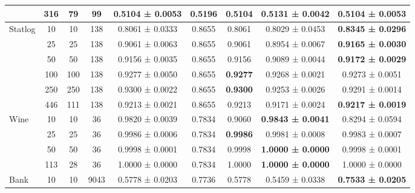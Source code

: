 \begin{table}
{\begin{tabular}[H]{@{}lcccccccc@{}}
                              & 316   & 79   & 99   & 0.5104 ± 0.0053      & 0.5196                & 0.5104          & \textbf{0.5131 ± 0.0042} & 0.5104 ± 0.0053          \\
                              \midrule
\multirow{6}{*}{Statlog}      & 10    & 10   & 138  & 0.8061 ± 0.0333      & 0.8655                & 0.8061          & 0.8029 ± 0.0453          & \textbf{0.8345 ± 0.0296} \\
                              & 25    & 25   & 138  & 0.9061 ± 0.0063      & 0.8655                & 0.9061          & 0.8954 ± 0.0067          & \textbf{0.9165 ± 0.0030} \\
                              & 50    & 50   & 138  & 0.9156 ± 0.0035      & 0.8655                & 0.9156          & 0.9089 ± 0.0044          & \textbf{0.9172 ± 0.0029} \\
                              & 100   & 100  & 138  & 0.9277 ± 0.0050      & 0.8655                & \textbf{0.9277} & 0.9268 ± 0.0021          & 0.9273 ± 0.0051          \\
                              & 250   & 250  & 138  & 0.9300 ± 0.0022      & 0.8655                & \textbf{0.9300} & 0.9253 ± 0.0026          & 0.9291 ± 0.0014          \\
                              & 446   & 111  & 138  & 0.9213 ± 0.0021      & 0.8655                & 0.9213          & 0.9171 ± 0.0024          & \textbf{0.9217 ± 0.0019} \\
                              \midrule
\multirow{4}{*}{Wine}         & 10    & 10   & 36   & 0.9820 ± 0.0039      & 0.7834                & 0.9060          & \textbf{0.9843 ± 0.0041} & 0.8294 ± 0.0594          \\
                              & 25    & 25   & 36   & 0.9986 ± 0.0006      & 0.7834                & \textbf{0.9986} & 0.9981 ± 0.0008          & 0.9983 ± 0.0007          \\
                              & 50    & 50   & 36   & 0.9998 ± 0.0001      & 0.7834                & 0.9998          & \textbf{1.0000 ± 0.0000} & 0.9998 ± 0.0001          \\
                              & 113   & 28   & 36   & 1.0000 ± 0.0000      & 0.7834                & 1.0000          & \textbf{1.0000 ± 0.0000} & 1.0000 ± 0.0000          \\
                              \midrule
\multirow{7}{*}{Bank}         & 10    & 10   & 9043 & 0.5778 ± 0.0203      & 0.7736                & 0.5778          & 0.5459 ± 0.0338          & \textbf{0.7533 ± 0.0205} \\

\end{tabular}}
\end{table}
